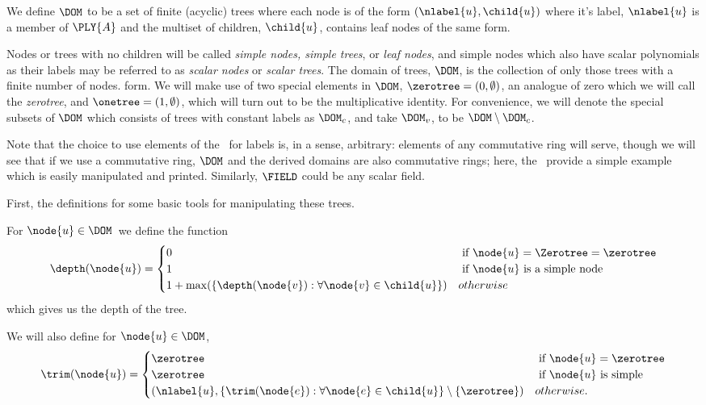 \begin{definition}\label{def-of-dom}
We define $\DOM$ to be a set of finite (acyclic) trees where each node is of the form
$(\nlabel{u}, \child{u})$ where it's label, $\nlabel{u}$ is a member of $\PLY{A}$ and
the multiset of children, $\child{u}$, contains leaf nodes of the same form.

Nodes or trees with no children will be called \emph{simple nodes, simple trees}, or
\emph{leaf nodes}, and simple nodes which also have scalar polynomials as their labels
may be referred to as \emph{scalar nodes} or \emph{scalar trees}. The domain of trees,
$\DOM$, is the collection of only those trees with a finite number of nodes.  form.  We
will make use of two special elements in $\DOM$, $\zerotree = (0, \emptyset)$, an analogue
of zero which we will call the \emph{zerotree}, and $\onetree = (1, \emptyset)$, which
will turn out to be the multiplicative identity. For convenience, we
will denote the special subsets  of $\DOM$ which consists of 
trees with constant labels as $\DOM_c$, and take $\DOM_v$, to be $\DOM
\setminus \DOM_c$.  %
\end{definition}

Note that the choice to use elements of the \polytypes\  for labels is, in a
sense, arbitrary: elements of any commutative ring will serve, though
we will see that if we use a commutative ring, $\DOM$ and the derived
domains are also commutative rings; here, the \polytypes\ provide a
simple example which is easily manipulated and printed. Similarly,
$\FIELD$ could be any scalar field.

First, the definitions for some basic tools for manipulating these trees.
\begin{definition}
  For $\node{u} \in \DOM$\ we define the function
  \begin{align*}
    \depth(\node{u}) = \begin{cases}
      0 & \text{ if } \node{u} = \Zerotree = \zerotree \\
      1 & \text{ if } \node{u} \text{ is a simple node} \\
      1 + \max(\lbrace\depth(\node{v}):\forall \node{v} \in \child{u}\rbrace) & otherwise
    \end{cases}
  \end{align*}
  which gives us the depth of the tree.
\end{definition}

\begin{definition}
  We will also define for $\node{u} \in \DOM$,
  \begin{align*}
    \trim(\node{u}) = \begin{cases}
      \zerotree & \text{ if } \node{u} = \zerotree \\
      \zerotree & \text{ if } \node{u} \text{ is simple} \\
      (\nlabel{u}, \lbrace \trim(\node{e}): \forall\node{e}\in\child{u} \rbrace \setminus \{\zerotree\}) & otherwise.
    \end{cases}
  \end{align*}
\end{definition}

